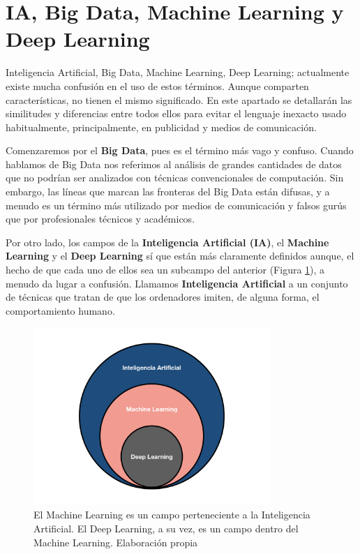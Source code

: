 \documentclass[
  12pt,
  spanish,
  a4paperpaper,
]{report}
\begin{document}
\hypertarget{ia-big-data-machine-learning-y-deep-learning}{%
\section{IA, Big Data, Machine Learning y Deep
Learning}\label{ia-big-data-machine-learning-y-deep-learning}}

Inteligencia Artificial, Big Data, Machine Learning, Deep Learning;
actualmente existe mucha confusión en el uso de estos términos. Aunque
comparten características, no tienen el mismo significado. En este
apartado se detallarán las similitudes y diferencias entre todos ellos
para evitar el lenguaje inexacto usado habitualmente, principalmente, en
publicidad y medios de comunicación.

Comenzaremos por el \textbf{Big Data}, pues es el término más vago y
confuso. Cuando hablamos de Big Data nos referimos al análisis de
grandes cantidades de datos que no podrían ser analizados con técnicas
convencionales de computación. Sin embargo, las líneas que marcan las
fronteras del Big Data están difusas, y a menudo es un término más
utilizado por medios de comunicación y falsos gurús que por
profesionales técnicos y académicos.

Por otro lado, los campos de la \textbf{Inteligencia Artificial (IA)},
el \textbf{Machine Learning} y el \textbf{Deep Learning} sí que están
más claramente definidos aunque, el hecho de que cada uno de ellos sea
un subcampo del anterior (Figura \ref{ia-ml}), a menudo da lugar a
confusión. Llamamos \textbf{Inteligencia Artificial} a un conjunto de
técnicas que tratan de que los ordenadores imiten, de alguna forma, el
comportamiento humano.

\begin{figure}
\centering
\includegraphics[width=0.8\textwidth,height=\textheight]{source/figures/ia-ml.png}
\caption{El Machine Learning es un campo perteneciente a la Inteligencia
Artificial. El Deep Learning, a su vez, es un campo dentro del Machine
Learning. Elaboración propia \label{ia-ml}}
\end{figure}
\end{document}
